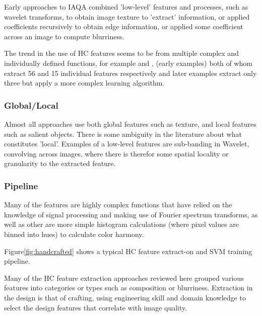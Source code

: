 Early approaches to IAQA combined 'low-level' features and processes, such as wavelet transforms, to obtain image texture to 'extract' information, or applied coefficients recursively to obtain edge information, or applied some coefficient across an image to compute blurriness. 

The trend in the use of HC features seems to be from multiple complex and individually defined functions, for example \cite{Datta2006} and \cite{Tong2004}, (early examples) both of whom extract 56 and 15 individual features respectively and later examples \cite{Gao2015a} extract only three but apply a more complex learning algorithm. 

\subsubsection{Global/Local}



Almost all approaches use both global features such as texture, and local features such as salient objects. There is some ambiguity in the literature about what constitutes 'local'. Examples of a low-level features are sub-banding in Wavelet, convolving across images, where there is therefor some spatial locality or granularity to the extracted feature. 

\subsubsection{Pipeline}

Many of the features are highly complex functions that have relied on the knowledge of signal processing and making use of Fourier spectrum transforms\cite{Ke2006}, as well as other are more simple histogram calculations (where pixel values are binned into hues) to calculate color harmony.

Figure\ref{fig:handcrafted} shows a typical HC feature extract-on and SVM training pipeline. 

Many of the HC feature extraction approaches reviewed here grouped various features into categories or types such as composition\cite{Lou2008} or blurriness\cite{Ke2006}. Extraction in the design is that of crafting, using engineering skill and domain knowledge to select the design features that correlate with image quality.  


